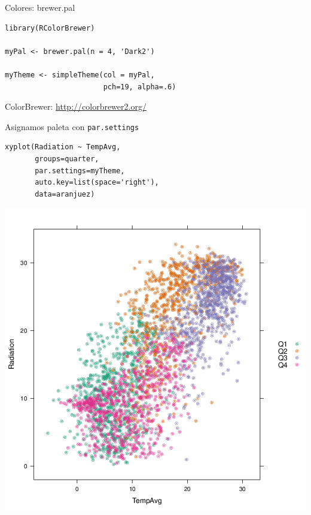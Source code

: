 \documentclass[xcolor={usenames,svgnames,dvipsnames}]{beamer}
\begin{document}
\begin{frame}[fragile,label=sec-3-25]{Colores: brewer.pal}
 \lstset{language=R,label= ,caption= ,numbers=none}
\begin{lstlisting}
library(RColorBrewer)

myPal <- brewer.pal(n = 4, 'Dark2')

myTheme <- simpleTheme(col = myPal,
                       pch=19, alpha=.6)
\end{lstlisting}

\begin{block}{ColorBrewer: \url{http://colorbrewer2.org/}}
\end{block}
\end{frame}

\begin{frame}[fragile,label=sec-3-26]{Asignamos paleta con \texttt{par.settings}}
 \lstset{language=R,label= ,caption= ,numbers=none}
\begin{lstlisting}
xyplot(Radiation ~ TempAvg,
       groups=quarter,
       par.settings=myTheme,
       auto.key=list(space='right'),
       data=aranjuez)
\end{lstlisting}
\end{frame}

\begin{frame}[label=sec-3-27]{}
\includegraphics[width=.9\linewidth]{figs/brewer.png}
\end{frame}
\end{document}
